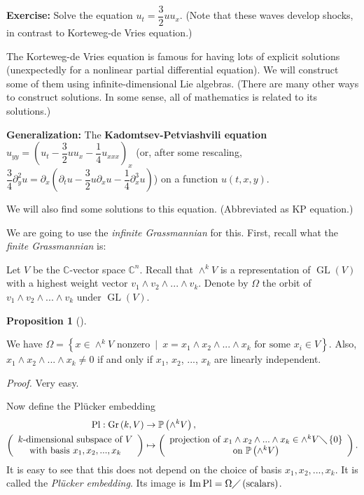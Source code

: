 \documentclass
[numbers=enddot,12pt,final,onecolumn,german,notitlepage]{scrartcl}%
\theoremstyle{definition}
\newtheorem{prop}[theo]{Proposition}
\newenvironment{proposition}[1][]
{\begin{prop}[#1]\begin{leftbar}}
{\end{leftbar}\end{prop}}
\begin{document}
\textbf{Exercise:} Solve the equation $u_{t}=\dfrac{3}{2}uu_{x}$. (Note that
these waves develop shocks, in contrast to Korteweg-de Vries equation.)

The Korteweg-de Vries equation is famous for having lots of explicit solutions
(unexpectedly for a nonlinear partial differential equation). We will
construct some of them using infinite-dimensional Lie algebras. (There are
many other ways to construct solutions. In some sense, all of mathematics is
related to its solutions.)

\textbf{Generalization:} The \textbf{Kadomtsev-Petviashvili equation}
$u_{yy}=\left(  u_{t}-\dfrac{3}{2}uu_{x}-\dfrac{1}{4}u_{xxx}\right)  _{x}$
(or, after some rescaling, $\dfrac{3}{4}\partial_{y}^{2}u=\partial_{x}\left(
\partial_{t}u-\dfrac{3}{2}u\partial_{x}u-\dfrac{1}{4}\partial_{x}^{3}u\right)
$) on a function $u\left(  t,x,y\right)  $.

We will also find some solutions to this equation. (Abbreviated as KP equation.)

We are going to use the \textit{infinite Grassmannian} for this. First, recall
what the \textit{finite Grassmannian} is:

Let $V$ be the $\mathbb{C}$-vector space $\mathbb{C}^{n}$. Recall that
$\wedge^{k}V$ is a representation of $\operatorname*{GL}\left(  V\right)  $
with a highest weight vector $v_{1}\wedge v_{2}\wedge...\wedge v_{k}$. Denote
by $\Omega$ the orbit of $v_{1}\wedge v_{2}\wedge...\wedge v_{k}$ under
$\operatorname*{GL}\left(  V\right)  $.

\begin{proposition}
We have $\Omega=\left\{  x\in\wedge^{k}V\text{ nonzero}\ \mid\ x=x_{1}\wedge
x_{2}\wedge...\wedge x_{k}\text{ for some }x_{i}\in V\right\}  $. Also,
$x_{1}\wedge x_{2}\wedge...\wedge x_{k}\neq0$ if and only if $x_{1}$, $x_{2}$,
$...$, $x_{k}$ are linearly independent.
\end{proposition}

\textit{Proof.} Very easy.

Now define the Pl\"{u}cker embedding%
\begin{align*}
\operatorname*{Pl}:\operatorname*{Gr}\left(  k,V\right)   &  \rightarrow
\mathbb{P}\left(  \wedge^{k}V\right)  ,\\
\left(
\begin{array}
[c]{c}%
k\text{-dimensional subspace of }V\\
\text{with basis }x_{1},x_{2},...,x_{k}%
\end{array}
\right)   &  \mapsto\left(
\begin{array}
[c]{c}%
\text{projection of }x_{1}\wedge x_{2}\wedge...\wedge x_{k}\in\wedge
^{k}V\diagdown\left\{  0\right\} \\
\text{on }\mathbb{P}\left(  \wedge^{k}V\right)
\end{array}
\right)  .
\end{align*}
It is easy to see that this does not depend on the choice of basis
$x_{1},x_{2},...,x_{k}$. It is called the \textit{Pl\"{u}cker embedding}. Its
image is $\operatorname*{Im}\operatorname*{Pl}=\Omega\diagup\left(
\text{scalars}\right)  $.
\end{document}
